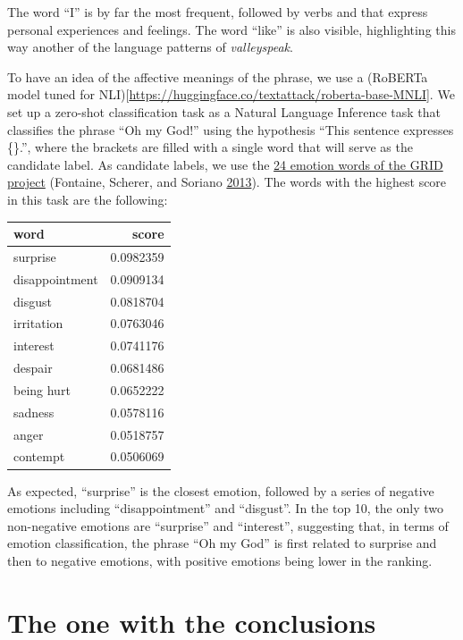 \documentclass[]{article}
\begin{document}
The word ``I'' is by far the most frequent, followed by verbs and that express personal experiences and feelings. The word ``like'' is also visible, highlighting this way another of the language patterns of \emph{valleyspeak}.

To have an idea of the affective meanings of the phrase, we use a (RoBERTa model tuned for NLI){[}\url{https://huggingface.co/textattack/roberta-base-MNLI}{]}. We set up a zero-shot classification task as a Natural Language Inference task that classifies the phrase ``Oh my God!'' using the hypothesis ``This sentence expresses \{\}.'', where the brackets are filled with a single word that will serve as the candidate label. As candidate labels, we use the \href{https://www.unige.ch/cisa/research/topics/specific-research-projects/language-and-culture/grid-project/emotion-words/}{24 emotion words of the GRID project} (Fontaine, Scherer, and Soriano \protect\hyperlink{ref-fontaine2013components}{2013}). The words with the highest score in this task are the following:

\begin{tabular}{l|r}
\hline
word & score\\
\hline
surprise & 0.0982359\\
\hline
disappointment & 0.0909134\\
\hline
disgust & 0.0818704\\
\hline
irritation & 0.0763046\\
\hline
interest & 0.0741176\\
\hline
despair & 0.0681486\\
\hline
being hurt & 0.0652222\\
\hline
sadness & 0.0578116\\
\hline
anger & 0.0518757\\
\hline
contempt & 0.0506069\\
\hline
\end{tabular}

As expected, ``surprise'' is the closest emotion, followed by a series of negative emotions including ``disappointment'' and ``disgust''. In the top 10, the only two non-negative emotions are ``surprise'' and ``interest'', suggesting that, in terms of emotion classification, the phrase ``Oh my God'' is first related to surprise and then to negative emotions, with positive emotions being lower in the ranking.

\hypertarget{the-one-with-the-conclusions}{%
\section{The one with the conclusions}\label{the-one-with-the-conclusions}}
\end{document}
